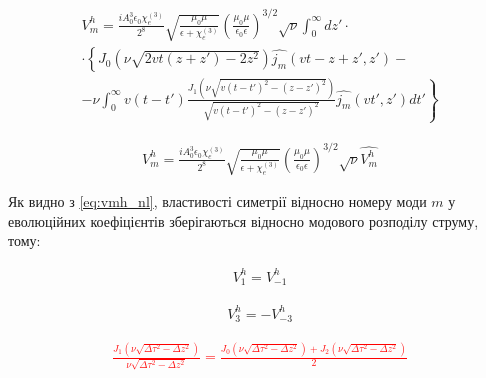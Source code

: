 %
\begin{equation} \begin{aligned} \label{eq:vmh_nl}
V_m^h = \frac{i A_0^3 \epsilon_0 \chi_e^{(3)}}{2^8}
\sqrt{\frac{\mu_0 \mu}{\epsilon + \chi_e^{(3)}}} 
\left( \frac{\mu_0 \mu}{\epsilon_0 \epsilon} \right)^{3/2} \sqrt{\nu}
\int_0^\infty dz' \cdot \\ \cdot 
\left\{ J_0 \left( \nu \sqrt{2 vt (z + z') - 2 z^2} \right) 
\hat{j_m} (vt - z + z',z') - \right. \\ 
\left. - \nu \int_0^\infty v (t-t') 
\frac{J_1 \left( \nu \sqrt{v(t-t')^2 - (z-z')^2} \right)}
{\sqrt{v(t-t')^2 - (z-z')^2}} \hat{j_m} (vt',z') dt' \right\}
\end{aligned} \end{equation}

\begin{equation} \begin{aligned} \label{eq:vmh_norm}
V_m^h = \frac{i A_0^3 \epsilon_0 \chi_e^{(3)}}{2^8}
\sqrt{\frac{\mu_0 \mu}{\epsilon + \chi_e^{(3)}}} 
\left( \frac{\mu_0 \mu}{\epsilon_0 \epsilon} \right)^{3/2} 
\sqrt{\nu} \hat{V_m^h}
\end{aligned} \end{equation}

Як видно з \eqref{eq:vmh_nl}, властивості симетрії відносно номеру моди 
$ m $ у еволюційних коефіцієнтів зберігаються відносно модового розподілу 
струму, тому:

\begin{equation} \begin{aligned} \label{eq:vp1_vm1}
V_1^h = V_{-1}^h
\end{aligned} \end{equation}

\begin{equation} \begin{aligned} \label{eq:vp3_vm3}
V_3^h = - V_{-3}^h
\end{aligned} \end{equation}

\textcolor{red} { \begin{equation*} \begin{aligned}
\frac{J_1 \left( \nu \sqrt{\Delta \tau^2 - \Delta z^2} \right)}
{\nu \sqrt{\Delta \tau^2 - \Delta z^2}} =
\frac{J_0 \left( \nu \sqrt{\Delta \tau^2 - \Delta z^2} \right) +
J_2 \left( \nu \sqrt{\Delta \tau^2 - \Delta z^2} \right)}{2}
\end{aligned} \end{equation*} }



